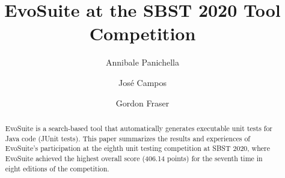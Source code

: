 \documentclass[sigconf]{acmart}
\newcommand{\EVOSUITE}{{\sc EvoSuite}\xspace}
\newcommand{\TOTALPOINTS}{{406.14}\xspace}
\begin{document}
\title{\EVOSUITE at the SBST 2020 Tool Competition}

\author{Annibale Panichella}

\author{Jos\'e Campos}

\author{Gordon Fraser}




\begin{abstract}
%
  \EVOSUITE is a search-based tool that automatically generates
  executable unit tests for Java code (JUnit tests).  This paper
  summarizes the results and experiences of \EVOSUITE's participation
  at the eighth unit testing competition at SBST 2020, where \EVOSUITE
  achieved the highest overall score (\TOTALPOINTS points) for the
  seventh time in eight editions of the competition.
\end{abstract}
\end{document}
